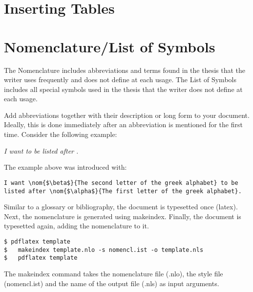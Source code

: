 

\section{Inserting Tables} %
\label{sec:inserting_tables}


\section{Nomenclature/List of Symbols} %
\label{sec:nomenclature}

The Nomenclature includes abbreviations and terms found in the thesis that the writer uses frequently and does not define at each usage. The List of Symbols includes all special symbols used in the thesis that the writer does not define at each usage.

Add abbreviations together with their description or long form to your document. Ideally, this is done immediately after an abbreviation is mentioned for the first time. Consider the following example:

\textit{I want  to be listed after .}

The example above was introduced with:

 \begin{lstlisting}
I want \nom{$\beta$}{The second letter of the greek alphabet} to be listed after \nom{$\alpha$}{The first letter of the greek alphabet}.
 \end{lstlisting}
 
Similar to a glossary or bibliography, the document is typesetted once (latex). Next, the nomenclature is generated using makeindex. Finally, the document is typesetted again, adding the nomenclature to it.

\begin{verbatim}
$ pdflatex template
$	makeindex template.nlo -s nomencl.ist -o template.nls
$	pdflatex template
\end{verbatim}

The makeindex command takes the nomenclature file (.nlo), the style file (nomencl.ist) and the name of the output file (.nls) as input arguments.

